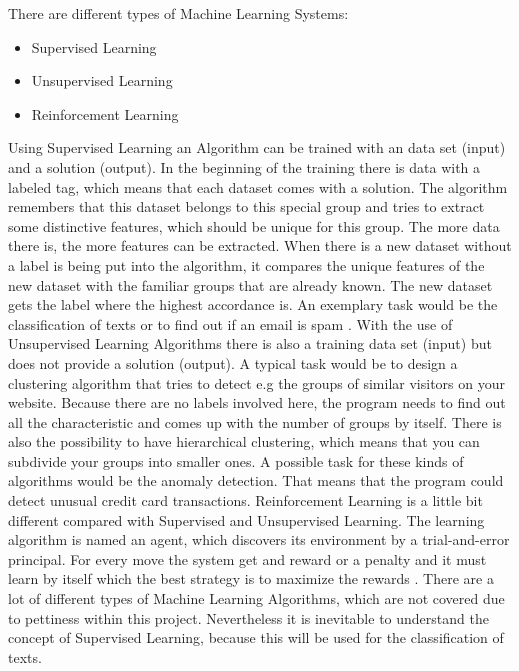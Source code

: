 \documentclass[notitlepage,english]{hgbreport}
\begin{document}
There are different types of Machine Learning Systems:
\begin{itemize}
\item Supervised Learning
\item Unsupervised Learning
\item Reinforcement Learning
\end{itemize}
\bigskip
Using Supervised Learning an Algorithm can be trained with an data set (input) and a solution (output). In the beginning of the training there is data with a labeled tag, which means that each dataset comes with a solution. The algorithm remembers that this dataset belongs to this special group and tries to extract some distinctive features, which should be unique for this group. The more data there is, the more features can be extracted. When there is a new dataset without a label is being put into the algorithm, it compares the unique features of the new dataset with the familiar groups that are already known. The new dataset gets the label where the highest accordance is. An exemplary task would be the classification of texts or to find out if an email is spam \cite{geron2017hands}.
\newline \newline
With the use of Unsupervised Learning Algorithms there is also a training data set (input) but does not provide a solution (output). A typical task would be to design a clustering algorithm that tries to detect e.g the groups of similar visitors on your website. Because there are no labels involved here, the program needs to find out all the characteristic and comes up with the number of groups by itself. There is also the possibility to have hierarchical clustering, which means that you can subdivide your groups into smaller ones. A possible task for these kinds of algorithms would be the anomaly detection. That means that the program could detect unusual credit card transactions\cite{geron2017hands}. 
\newline \newline
Reinforcement Learning is a little bit different compared with Supervised and Unsupervised Learning. The learning algorithm is named an agent, which discovers its environment by a trial-and-error principal. For every move the system get and reward or a penalty and it must learn by itself which the best strategy is to maximize the rewards \cite{geron2017hands}. 
\newline \newline
There are a lot of different types of Machine Learning Algorithms, which are not covered due to pettiness within this project. Nevertheless it is inevitable to understand the concept of Supervised Learning, because this will be used for the classification of texts.
\end{document}

